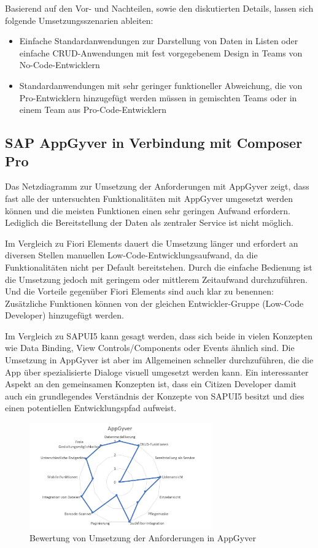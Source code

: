 Basierend auf den Vor- und Nachteilen, sowie den diskutierten Details, lassen sich folgende Umsetzungsszenarien ableiten:
\begin{itemize} 
  \item Einfache Standardanwendungen zur Darstellung von Daten in Listen oder einfache CRUD-Anwendungen mit fest vorgegebenem Design in Teams von No-Code-Entwicklern
  \item Standardanwendungen mit sehr geringer funktioneller Abweichung, die von Pro-Entwicklern hinzugefügt werden müssen in gemischten Teams oder in einem Team aus Pro-Code-Entwicklern
\end{itemize}

\subsection{SAP AppGyver in Verbindung mit Composer Pro}
Das Netzdiagramm zur Umsetzung der Anforderungen mit AppGyver zeigt, dass fast alle der untersuchten Funktionalitäten mit AppGyver umgesetzt werden können und die meisten Funktionen einen sehr geringen Aufwand erfordern. Lediglich die Bereitstellung der Daten als zentraler Service ist nicht möglich. 

Im Vergleich zu Fiori Elements dauert die Umsetzung länger und erfordert an diversen Stellen manuellen Low-Code-Entwicklungsaufwand, da die Funktionalitäten nicht per Default bereitstehen. Durch die einfache Bedienung ist die Umsetzung jedoch mit geringem oder mittlerem Zeitaufwand durchzuführen. Und die Vorteile gegenüber Fiori Elements sind auch klar zu benennen: Zusätzliche Funktionen können von der gleichen Entwickler-Gruppe (Low-Code Developer) hinzugefügt werden.

Im Vergleich zu SAPUI5 kann gesagt werden, dass sich beide in vielen Konzepten wie Data Binding, View Controls/Components oder Events ähnlich sind. Die Umsetzung in AppGyver ist aber im Allgemeinen schneller durchzuführen, die die App über spezialisierte Dialoge visuell umgesetzt werden kann. Ein interessanter Aspekt an den gemeinsamen Konzepten ist, dass ein Citizen Developer damit auch ein grundlegendes Verständnis der Konzepte von SAPUI5 besitzt und dies einen potentiellen Entwicklungspfad aufweist.

\begin{figure}[!htbp]
 \centering
 \includegraphics[width=0.7\textwidth]{Bilder/bewertung/ND_AppGyver.jpg}
 \caption{Bewertung von Umsetzung der Anforderungen in AppGyver}
\end{figure}

